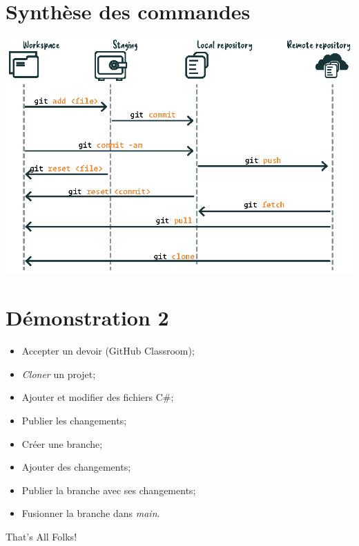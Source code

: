 \documentclass[10pt]{beamer}
\begin{document}
\section{Synthèse des commandes}
\begin{frame}{\secname}
    \centerline{\includegraphics[height=0.8\textheight]{img/synthese.eps}}
\end{frame}


\section{Démonstration 2}
\begin{frame}{\secname}
    \begin{itemize}
        \item Accepter un devoir (GitHub Classroom);
        \item \emph{Cloner} un projet;
        \item Ajouter et modifier des fichiers C\#;
        \item Publier les changements;
        \item Créer une branche;
        \item Ajouter des changements;
        \item Publier la branche avec ses changements;
        \item Fusionner la branche dans \emph{main}.
    \end{itemize}
\end{frame}

\appendix

\begin{frame}[standout]
    That's All Folks!
\end{frame}
\end{document}
